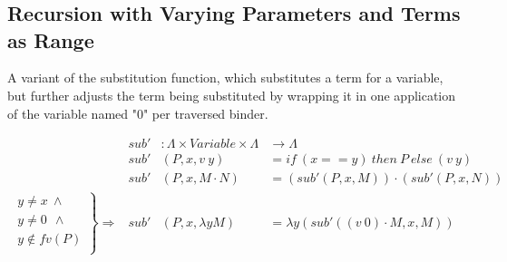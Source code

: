 \documentclass{entcs}
\begin{document}
\begin{code}
\\
\>[0]\<[2]%
\>[2]   \AgdaSymbol{=}  \AgdaSymbol{(} \AgdaSymbol{)}  \AgdaFunction{++}  \AgdaSymbol{(} \AgdaSymbol{)} \<%
\\
\>[0]\<[2]%
\>[2] \AgdaSymbol{:}    \AgdaSymbol{(} \AgdaSymbol{)}   \AgdaSymbol{(} \AgdaSymbol{)}\<%
\\
\>[0]\<[2]%
\>[2]   \AgdaSymbol{=}  \AgdaSymbol{(} \AgdaSymbol{)} \<%
\end{code}


\subsection{Recursion with Varying Parameters and Terms as Range}

A variant of the substitution function, which substitutes a term for a variable, but further adjusts the term being substituted by wrapping it in one application of the variable named "0" per traversed binder.

\[
\begin{array}{rrll}
&sub' &: \Lambda \times Variable \times  \Lambda &   \rightarrow  \Lambda  \\
&sub' &(P , x , v\ y)         &= if\ (x == y)\ then\ P\ else\ (v\ y)   \\
&sub' &(P , x , M \cdot N)    &= (sub' (P , x , M)) \cdot (sub' (P , x , N)) \\
\left. 
\begin{array}{c}
y \neq x  \ \wedge \\
 y \neq 0\ \  \wedge \\
 y \not\in fv(P) \\
\end{array} \right\} \Rightarrow&sub' &(P , x , \lambda y M)   &= \lambda y (sub' ((v\ 0) \cdot M , x , M)) \\
\end{array} \]
\end{document}
